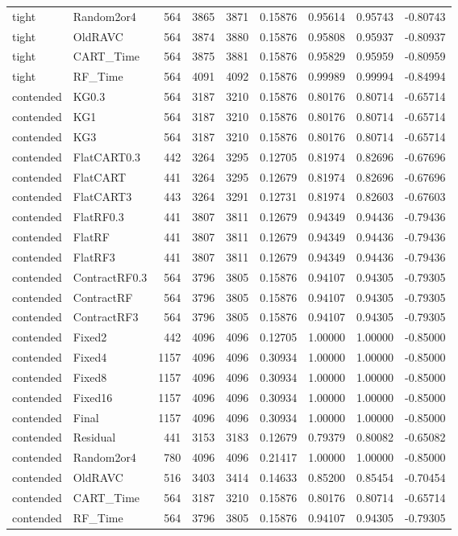 \begin{longtable}{@{}llrrrrrrr@{}}
tight & Random2or4 & 564 & 3865 & 3871 & 0.15876 & 0.95614 & 0.95743 & -0.80743\\
tight & OldRAVC & 564 & 3874 & 3880 & 0.15876 & 0.95808 & 0.95937 & -0.80937\\
tight & CART\_Time & 564 & 3875 & 3881 & 0.15876 & 0.95829 & 0.95959 & -0.80959\\
tight & RF\_Time & 564 & 4091 & 4092 & 0.15876 & 0.99989 & 0.99994 & -0.84994\\
contended & KG0.3 & 564 & 3187 & 3210 & 0.15876 & 0.80176 & 0.80714 & -0.65714\\
contended & KG1 & 564 & 3187 & 3210 & 0.15876 & 0.80176 & 0.80714 & -0.65714\\
contended & KG3 & 564 & 3187 & 3210 & 0.15876 & 0.80176 & 0.80714 & -0.65714\\
contended & FlatCART0.3 & 442 & 3264 & 3295 & 0.12705 & 0.81974 & 0.82696 & -0.67696\\
contended & FlatCART & 441 & 3264 & 3295 & 0.12679 & 0.81974 & 0.82696 & -0.67696\\
contended & FlatCART3 & 443 & 3264 & 3291 & 0.12731 & 0.81974 & 0.82603 & -0.67603\\
contended & FlatRF0.3 & 441 & 3807 & 3811 & 0.12679 & 0.94349 & 0.94436 & -0.79436\\
contended & FlatRF & 441 & 3807 & 3811 & 0.12679 & 0.94349 & 0.94436 & -0.79436\\
contended & FlatRF3 & 441 & 3807 & 3811 & 0.12679 & 0.94349 & 0.94436 & -0.79436\\
contended & ContractRF0.3 & 564 & 3796 & 3805 & 0.15876 & 0.94107 & 0.94305 & -0.79305\\
contended & ContractRF & 564 & 3796 & 3805 & 0.15876 & 0.94107 & 0.94305 & -0.79305\\
contended & ContractRF3 & 564 & 3796 & 3805 & 0.15876 & 0.94107 & 0.94305 & -0.79305\\
contended & Fixed2 & 442 & 4096 & 4096 & 0.12705 & 1.00000 & 1.00000 & -0.85000\\
contended & Fixed4 & 1157 & 4096 & 4096 & 0.30934 & 1.00000 & 1.00000 & -0.85000\\
contended & Fixed8 & 1157 & 4096 & 4096 & 0.30934 & 1.00000 & 1.00000 & -0.85000\\
contended & Fixed16 & 1157 & 4096 & 4096 & 0.30934 & 1.00000 & 1.00000 & -0.85000\\
contended & Final & 1157 & 4096 & 4096 & 0.30934 & 1.00000 & 1.00000 & -0.85000\\
contended & Residual & 441 & 3153 & 3183 & 0.12679 & 0.79379 & 0.80082 & -0.65082\\
contended & Random2or4 & 780 & 4096 & 4096 & 0.21417 & 1.00000 & 1.00000 & -0.85000\\
contended & OldRAVC & 516 & 3403 & 3414 & 0.14633 & 0.85200 & 0.85454 & -0.70454\\
contended & CART\_Time & 564 & 3187 & 3210 & 0.15876 & 0.80176 & 0.80714 & -0.65714\\
contended & RF\_Time & 564 & 3796 & 3805 & 0.15876 & 0.94107 & 0.94305 & -0.79305\\
\bottomrule\end{longtable}\normalsize
